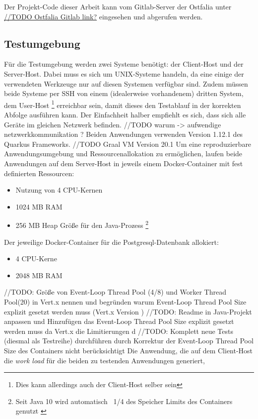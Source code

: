 Der Projekt-Code dieser Arbeit kann vom Gitlab-Server der Ostfalia unter
\url{//TODO Ostfalia Gitlab link?} eingesehen und abgerufen werden.

\subsection{Testumgebung}
\label{section:testumgebung}
Für die Testumgebung werden zwei Systeme benötigt: der Client-Host und der Server-Host.
Dabei muss es sich um UNIX-Systeme handeln, da eine einige der verwendeten Werkzeuge nur
auf diesen Systemen verfügbar sind.
Zudem müssen beide Systeme per SSH von einem (idealerweise vorhandenem) dritten System, dem User-Host
\footnote{Dies kann allerdings auch der Client-Host selber sein}
erreichbar sein, damit dieses den Testablauf in der korrekten Abfolge ausführen kann.
Der Einfachheit halber empfiehlt es sich, dass sich alle Geräte im gleichen Netzwerk befinden.
//TODO warum -> aufwendige netzwerkkommunikation ?
Beiden Anwendungen verwenden Version 1.12.1 des Quarkus Frameworks.
//TODO Graal VM Version 20.1
Um eine reproduzierbare Anwendungsumgebung und Ressourcenallokation zu ermöglichen, laufen beide Anwendungen auf dem Server-Host in
jeweils einem Docker-Container mit fest definierten Ressourcen:
\begin{itemize}
	\item Nutzung von 4 CPU-Kernen
	\item 1024 MB RAM
	\item 256 MB Heap Größe für den Java-Prozess
	      \footnote{Seit Java 10 wird automatisch ~1/4 des Speicher Limits des Containers genutzt \parencite{Java10ReleaseNotes}}
\end{itemize}
Der jeweilige Docker-Container für die Postgresql-Datenbank allokiert:
\begin{itemize}
	\item 4 CPU-Kerne
	\item 2048 MB RAM
\end{itemize}
//TODO: Größe von Event-Loop Thread Pool (4/8) und Worker Thread Pool(20) in Vert.x nennen und begründen warum Event-Loop Thread Pool Size explizit
gesetzt werden muss (Vert.x Version )
//TODO: Readme in Java-Projekt anpassen und Hinzufügen das Event-Loop Thread Pool Size explizit gesetzt werden muss da Vert.x die Limitierungen d
//TODO: Komplett neue Tests (diesmal als Testreihe) durchführen durch Korrektur der Event-Loop Thread Pool Size
des Containers nicht berücksichtigt
Die Anwendung, die auf dem Client-Host die \textit{work load} für die beiden zu testenden Anwendungen generiert,
